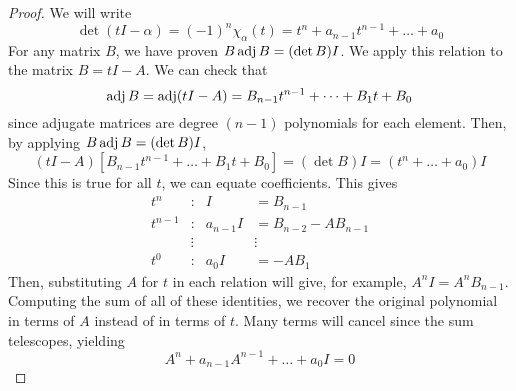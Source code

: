 \begin{proof}
	We will write
	\[
		\det(t I - \alpha) = (-1)^n \chi_\alpha(t) = t^n + a_{n-1}t^{n-1} + \dots + a_0
	\]
	For any matrix \( B \), we have proven \( B \operatorname{adj} B = (\det B) I \).
	We apply this relation to the matrix \( B = tI - A \).
	We can check that
	\[
		\operatorname{adj} B = \operatorname{adj}(tI - A) = B_{n-1} t^{n-1} + \dots + B_1 t + B_0
	\]
	since adjugate matrices are degree \( (n-1) \) polynomials for each element.
	Then, by applying \( B \operatorname{adj} B = (\det B) I \),
	\[
		(tI - A) [ B_{n-1} t^{n-1} + \dots + B_1 t + B_0 ] = (\det B) I = (t^n + \dots + a_0) I
	\]
	Since this is true for all \( t \), we can equate coefficients.
	This gives
	\begin{align*}
		t^n     & :      & I         & = B_{n-1}            \\
		t^{n-1} & :      & a_{n-1} I & = B_{n-2} - AB_{n-1} \\
		        & \vdots &           & \vdots               \\
		t^0     & :      & a_0 I     & = -A B_1
	\end{align*}
	Then, substituting \( A \) for \( t \) in each relation will give, for example, \( A^n I = A^n B_{n-1} \).
	Computing the sum of all of these identities, we recover the original polynomial in terms of \( A \) instead of in terms of \( t \).
	Many terms will cancel since the sum telescopes, yielding
	\[
		A^n + a_{n-1} A^{n-1} + \dots + a_0 I = 0
	\]
\end{proof}

